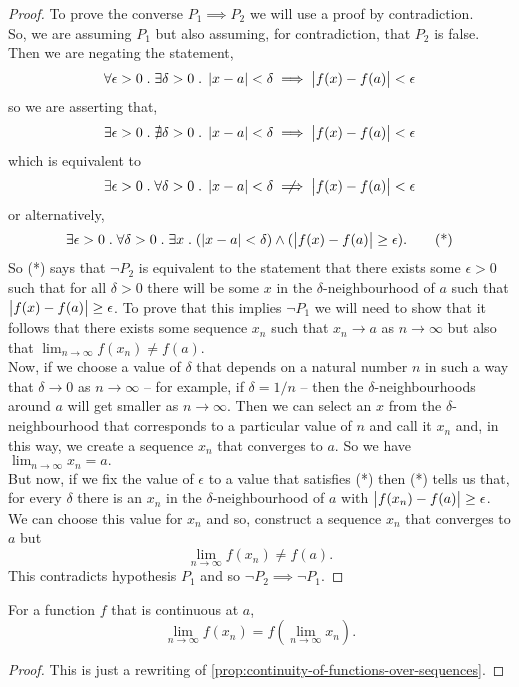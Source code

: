 \documentclass[../MathsNotesBase.tex]{subfiles}
\begin{document}
\begin{proof}
		\nl[6]
		To prove the converse ${ P_1 \implies P_2 }$ we will use a proof by contradiction.\\
		So, we are assuming $P_1$ but also assuming, for contradiction, that $P_2$ is false. Then we are negating the statement,
		\[ \forall \epsilon > 0 \;.\; \exists \delta > 0 \;.\; \left\lvert x - a\right\rvert < \delta \implies \left\lvert f(x) - f(a)\right\rvert < \epsilon \]
		so we are asserting that,
		\[ \exists \epsilon > 0 \;.\; \nexists \delta > 0 \;.\; \left\lvert x - a\right\rvert < \delta \implies \left\lvert f(x) - f(a)\right\rvert < \epsilon \]
		which is equivalent to
		\[ \exists \epsilon > 0 \logicsep \forall \delta > 0 \logicsep \abs{x - a} < \delta \centernot\implies \abs{f(x) - f(a)} < \epsilon \]
		or alternatively,
		\[ \exists \epsilon > 0 \;.\; \forall \delta > 0 \;.\; \exists x \;.\; (\left\lvert x - a\right\rvert < \delta) \wedge (\left\lvert f(x) - f(a)\right\rvert \geq \epsilon).  \tag{*} \]
		So (*) says that $\lnot{P_2}$ is equivalent to the statement that there exists some ${ \epsilon > 0 }$ such that for all ${ \delta > 0 }$ there will be some $x$ in the $\delta$-neighbourhood of $a$ such that ${ \left\lvert f(x) - f(a)\right\rvert \geq \epsilon }$. To prove that this implies $\lnot{P_1}$ we will need to show that it follows that there exists some sequence $x_n$ such that ${ x_n \to a }$ as ${ n \to \infty }$ but also that ${ \lim_{n \to \infty} f(x_n) \neq f(a) }$.\\
		
		Now, if we choose a value of $\delta$ that depends on a natural number $n$ in such a way that ${ \delta \to 0 }$ as ${ n \to \infty }$ -- for example, if ${ \delta = 1/n }$ -- then the $\delta$-neighbourhoods around $a$ will get smaller as ${ n \to \infty. }$ Then we can select an $x$ from the $\delta$-neighbourhood that corresponds to a particular value of $n$ and call it $x_n$ and, in this way, we create a sequence $x_n$ that converges to $a$. So we have ${ \lim_{n \to \infty} x_n = a. }$\\
		
		But now, if we fix the value of $\epsilon$ to a value that satisfies (*) then (*) tells us that, for every $\delta$ there is an $x_n$ in the $\delta$-neighbourhood of $a$ with ${ \left\lvert f(x_n) - f(a)\right\rvert \geq \epsilon }$. We can choose this value for $x_n$ and so, construct a sequence $x_n$ that converges to $a$ but
		\[ \lim_{n \to \infty} f(x_n) \neq f(a). \]
		This contradicts hypothesis $P_1$ and so ${ \lnot{P_2} \implies \lnot{P_1} }$.
	\end{proof}
	\begin{corollary}\label{cor:lim_of_func_of_convergent_sequence_is_func_of_limit}
		For a function $f$ that is continuous at $a$, 
		\[ \lim_{n \to \infty} f(x_n) = f\left( \lim_{n \to \infty} x_n \right). \]
	\end{corollary}
	\begin{proof}
		This is just a rewriting of \autoref{prop:continuity-of-functions-over-sequences}.
	\end{proof}
\end{document}
